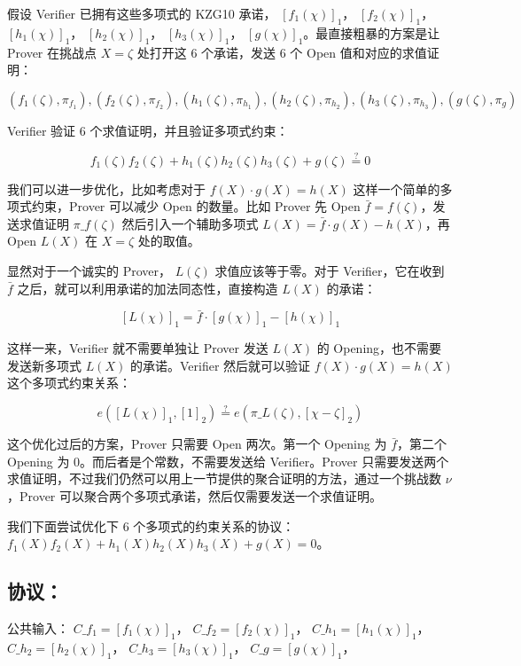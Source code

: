 假设 Verifier 已拥有这些多项式的 KZG10 承诺， \([f_1(\chi)]_1\)，
\([f_2(\chi)]_1\)， \([h_1(\chi)]_1\)， \([h_2(\chi)]_1\)，
\([h_3(\chi)]_1\)， \([g(\chi)]_1\)。最直接粗暴的方案是让 Prover
在挑战点 \(X=\zeta\) 处打开这 6 个承诺，发送 6 个 Open
值和对应的求值证明：

\[
(f_1(\zeta),\pi_{f_1}),(f_2(\zeta),\pi_{f_2}),(h_1(\zeta),\pi_{h_1}),(h_2(\zeta),\pi_{h_2}),(h_3(\zeta),\pi_{h_3}),(g(\zeta),\pi_{g})
\]

Verifier 验证 \(6\) 个求值证明，并且验证多项式约束：

\[
f_1(\zeta)f_2(\zeta) + h_1(\zeta)h_2(\zeta)h_3(\zeta) + g(\zeta) \overset{?}{=} 0
\]

我们可以进一步优化，比如考虑对于 \(f(X) \cdot g(X) = h(X)\)
这样一个简单的多项式约束，Prover 可以减少 Open 的数量。比如 Prover 先
Open \(\bar{f} = f(\zeta)\)，发送求值证明 \(\pi\_{f(\zeta)}\)
然后引入一个辅助多项式 \(L(X)= \bar{f}\cdot g(X)-h(X)\)，再 Open
\(L(X)\) 在 \(X=\zeta\) 处的取值。

显然对于一个诚实的 Prover， \(L(\zeta)\) 求值应该等于零。对于
Verifier，它在收到 \(\bar{f}\)
之后，就可以利用承诺的加法同态性，直接构造 \(L(X)\) 的承诺：

\[
[L(\chi)]_1 = \bar{f}\cdot [g(\chi)]_1 - [h(\chi)]_1
\]

这样一来，Verifier 就不需要单独让 Prover 发送 \(L(X)\) 的
Opening，也不需要发送新多项式 \(L(X)\) 的承诺。Verifier 然后就可以验证
\(f(X) \cdot g(X) = h(X)\) 这个多项式约束关系：

\[
e([L(\chi)]_1, [1]_2)\overset{?}{=} e(\pi\_{L(\zeta)}, [\chi-\zeta]_2)
\]

这个优化过后的方案，Prover 只需要 Open 两次。第一个 Opening 为
\(\bar{f}\)，第二个 Opening 为 \(0\)。而后者是个常数，不需要发送给
Verifier。Prover
只需要发送两个求值证明，不过我们仍然可以用上一节提供的聚合证明的方法，通过一个挑战数
\(\nu\)，Prover 可以聚合两个多项式承诺，然后仅需要发送一个求值证明。

我们下面尝试优化下 \(6\) 个多项式的约束关系的协议：
\(f_1(X)f_2(X) + h_1(X)h_2(X)h_3(X) + g(X) = 0\)。

\hypertarget{ux534fux8bae-1}{%
\subsection{协议：}\label{ux534fux8bae-1}}

公共输入： \(C\_{f_1}=[f_1(\chi)]_1\)， \(C\_{f_2}=[f_2(\chi)]_1\)，
\(C\_{h_1}=[h_1(\chi)]_1\)， \(C\_{h_2}=[h_2(\chi)]_1\)，
\(C\_{h_3}=[h_3(\chi)]_1\)， \(C\_{g}=[g(\chi)]_1\)，

